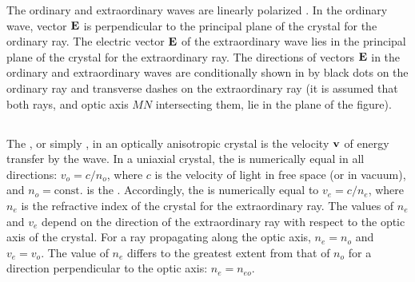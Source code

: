 The ordinary and extraordinary waves are linearly polarized
. In the ordinary wave, vector $\vb{E}$ is perpendicular to the principal plane of the crystal for the ordinary ray. The
electric vector $\vb{E}$ of the extraordinary wave lies in the principal plane of the crystal for the extraordinary ray. The directions of vectors $\vb{E}$ in the ordinary and extraordinary waves are conditionally shown in  by black dots on the ordinary ray and transverse dashes on the extraordinary ray (it is assumed that both rays, and optic axis $MN$ intersecting them, lie
in the plane of the figure).




\subsection{}\label{35.2.5} The , or simply , in an optically anisotropic crystal is the velocity $\vb{v}$ of energy transfer by the wave. In a uniaxial crystal, the  is numerically equal in all directions: $v_{o} = c/n_{o}$, where $c$ is the velocity of light in free space (or in vacuum), and $n_{o} = \text{const}.$ is the . Accordingly, the  is numerically equal to $v_{e} = c/n_{e}$, where $n_{e}$ is the refractive index of the crystal for the extraordinary ray. The values of $n_{e}$ and $v_{e}$ depend on the direction of the extraordinary ray with respect to the optic axis of the crystal. For a ray propagating along the optic axis,
$n_{e} = n_{o}$ and $v_{e} = v_{o}$. The value of $n_{e}$ differs to the greatest extent from that of $n_{o}$ for a direction perpendicular to the optic axis: $n_{e} = n_{eo}$.

